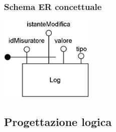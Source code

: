 \subsubsection{Schema ER concettuale}

\begin{center}
    \includegraphics[width=4.5cm]{contenuti/specifica-basi-dati/img-sbd/logging_concettuale.png}
\end{center}

\subsection{Progettazione logica}